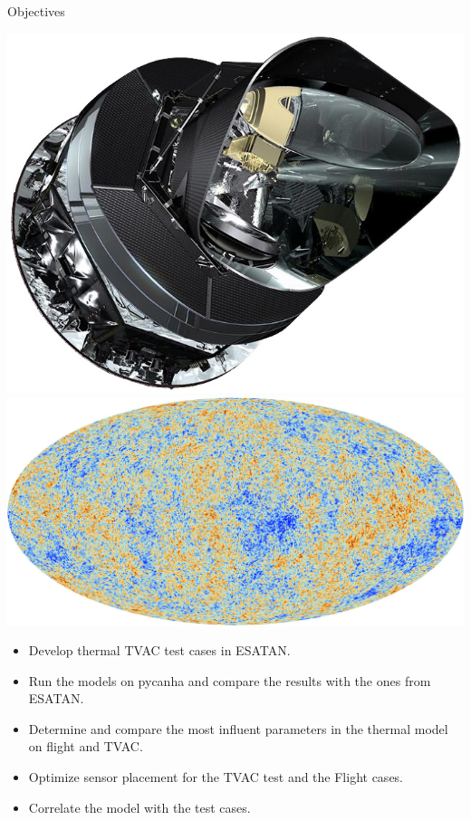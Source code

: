 \begin{frame}{Objectives}
    \begin{minipage}{0.3\textwidth}
        \includegraphics[width=0.9\linewidth]{Figures/Planck1.jpg} \\
        \includegraphics[width=0.9\linewidth]{Figures/Planck2.jpg}
    \end{minipage}
    \begin{minipage}{0.65\textwidth}
        \begin{itemize}
            \item Develop thermal TVAC test cases in ESATAN.
            \item Run the models on pycanha and compare the results with the ones from ESATAN.
            \item Determine and compare the most influent parameters in the thermal model on flight and TVAC.
            \item Optimize sensor placement for the TVAC test and the Flight cases. 
            \item Correlate the model with the test cases.
        \end{itemize}
    \end{minipage}
\end{frame}

